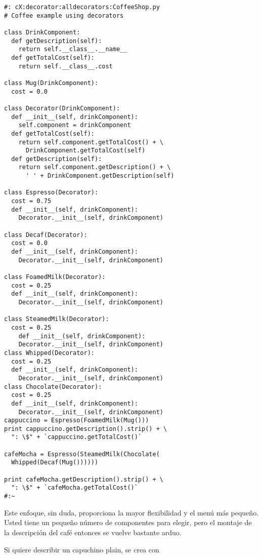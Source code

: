 \begin{lstlisting} 
#: cX:decorator:alldecorators:CoffeeShop.py 
# Coffee example using decorators

class DrinkComponent: 
  def getDescription(self): 
    return self.__class__.__name__ 
  def getTotalCost(self): 
    return self.__class__.cost 
    
class Mug(DrinkComponent): 
  cost = 0.0 
  
class Decorator(DrinkComponent): 
  def __init__(self, drinkComponent): 
    self.component = drinkComponent 
  def getTotalCost(self): 
    return self.component.getTotalCost() + \ 
      DrinkComponent.getTotalCost(self) 
  def getDescription(self): 
    return self.component.getDescription() + \ 
      ' ' + DrinkComponent.getDescription(self) 
      
class Espresso(Decorator): 
  cost = 0.75 
  def __init__(self, drinkComponent): 
    Decorator.__init__(self, drinkComponent) 
    
class Decaf(Decorator): 
  cost = 0.0 
  def __init__(self, drinkComponent): 
    Decorator.__init__(self, drinkComponent) 
    
class FoamedMilk(Decorator): 
  cost = 0.25 
  def __init__(self, drinkComponent): 
    Decorator.__init__(self, drinkComponent) 
    
class SteamedMilk(Decorator): 
  cost = 0.25 
    def __init__(self, drinkComponent): 
    Decorator.__init__(self, drinkComponent) 
class Whipped(Decorator): 
  cost = 0.25 
  def __init__(self, drinkComponent): 
    Decorator.__init__(self, drinkComponent) 
class Chocolate(Decorator): 
  cost = 0.25 
  def __init__(self, drinkComponent): 
    Decorator.__init__(self, drinkComponent) 
cappuccino = Espresso(FoamedMilk(Mug())) 
print cappuccino.getDescription().strip() + \ 
  ": \$" + `cappuccino.getTotalCost()`
  
cafeMocha = Espresso(SteamedMilk(Chocolate( 
  Whipped(Decaf(Mug()))))) 
  
print cafeMocha.getDescription().strip() + \ 
  ": \$" + `cafeMocha.getTotalCost()` 
#:~ 
\end{lstlisting}

Este enfoque, sin duda, proporciona la mayor flexibilidad y el menú más pequeño. Usted tiene un pequeño número de componentes para elegir,  pero el montaje de la descripción del café entonces se vuelve bastante arduo.   \newline

Si quiere describir un capuchino plain, se crea con \newline


